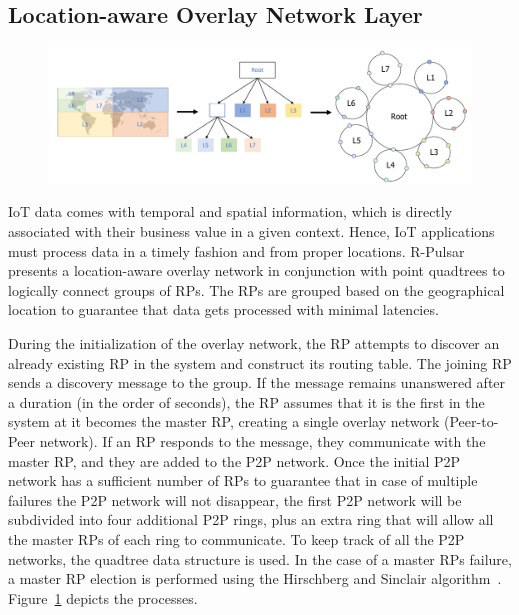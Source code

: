 \subsection{Location-aware Overlay Network Layer}

\begin{figure}[!h]
  \centering
  \includegraphics[width=1\columnwidth]{Figures/quadtree.pdf}
  \caption{}\label{fig:quadT}
\end{figure}

IoT data comes with temporal and spatial information, which is directly associated with their business value in a given context. Hence, IoT applications must process data in a timely fashion and from proper locations. R-Pulsar presents a location-aware overlay network in conjunction with point quadtrees to logically connect groups of RPs. The RPs are grouped based on the geographical location to guarantee that data gets processed with minimal latencies.

During the initialization of the overlay network, the RP attempts to discover an already existing RP in the system and construct its routing table. The joining RP sends a discovery message to the group. If the message remains unanswered after a duration (in the order of seconds), the RP assumes that it is the first in the system at it becomes the master RP, creating a single overlay network (Peer-to-Peer network).  If an RP responds to the message, they communicate with the master RP, and they are added to the P2P network. Once the initial P2P network has a sufficient number of RPs to guarantee that in case of multiple failures the P2P network will not disappear, the first P2P network will be subdivided into four additional P2P rings, plus an extra ring that will allow all the master RPs of each ring to communicate. To keep track of all the P2P networks, the quadtree data structure is used. In the case of a master RPs failure, a master RP election is performed using the Hirschberg and Sinclair algorithm~\cite{Hirschberg}. Figure~\ref{fig:quadT} depicts the processes.



